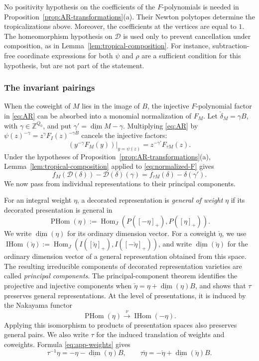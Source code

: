 \documentclass[11pt]{amsart}
\numberwithin{equation}{section}
\theoremstyle{definition}
\theoremstyle{remark}
\newcommand{\op}[1]{\operatorname{#1}}
\newcommand{\ZZ}{\mathbb Z}
\newcommand{\Hom}{\op{Hom}}
\newcommand{\dv}{\underline{\dim}}
\begin{document}
No positivity hypothesis on the coefficients of the $F$-polynomials is
needed in Proposition~\ref{prop:AR-transformations}(a). Their Newton
polytopes determine the tropicalizations above. Moreover, the
coefficients at the vertices are equal to $1$. The homeomorphism
hypothesis on $\mathcal D$ is used only to prevent cancellation under
composition, as in Lemma~\ref{lem:tropical-composition}. For instance,
subtraction-free coordinate expressions for both $\psi$ and $\rho$ are
a sufficient condition for this hypothesis, but are not part of the
statement.

\subsubsection*{The invariant pairings}

When the coweight of $M$ lies in the image of $B$, the injective
$F$-polynomial factor in \eqref{eq:AR} can be absorbed into a monomial
normalization of $F_M$. Let $\check\delta_M=\gamma B$, with $\gamma\in\ZZ^{Q_0}$, and put
$\gamma'=\dv M-\gamma$.
Multiplying \eqref{eq:AR} by
$\psi(z)^{-\gamma}=z^\gamma F_I(z)^{-\gamma B}$ cancels the
injective factors:
\begin{equation}\label{eq:normalized-F} \left(y^{-\gamma}F_M(y)\right)\big|_{y=\psi(z)}=z^{-\gamma'}F_{\tau M}(z).\end{equation}
Under the hypotheses of Proposition~\ref{prop:AR-transformations}(a),
Lemma~\ref{lem:tropical-composition} applied to \eqref{eq:normalized-F}
gives
\begin{equation}\label{eq:invariant-pairing} f_M(\mathcal D(\delta))-\mathcal D(\delta)(\gamma)=f_{\tau M}(\delta)-\delta(\gamma').\end{equation}
We now pass from individual representations to their principal
components.


For an integral weight $\eta$, a decorated representation is \emph{general of
weight} $\eta$ if its decorated presentation is general in
\[ \op{PHom}(\eta):=\Hom_J(P([-\eta]_+),P([\eta]_+)). \]
We write $\dv(\eta)$ for its ordinary dimension vector. For a
coweight $\check\eta$, we use
$\op{IHom}(\check\eta):=\Hom_J(I([\check\eta]_+),I([-\check\eta]_+))$,
and write $\dv(\check\eta)$ for the ordinary dimension vector of a
general representation obtained from this space.
The resulting irreducible components of decorated representation varieties
are called \emph{principal components}.
The principal-component theorem \cite[Theorem~3.11]{FeiR25} identifies the
projective and injective components when
$\check\eta=\eta+\dv(\eta)B$, and shows that $\tau$ preserves
general representations. At the level of presentations, it is induced by
the Nakayama functor
\[ \op{PHom}(\eta)\xrightarrow{\ \nu\ }\op{IHom}(-\eta). \]
Applying this isomorphism to products of presentation spaces also
preserves general pairs. We also write $\tau$ for the induced
translation of weights and coweights. Formula \eqref{eq:app-weights} gives
\begin{equation}\label{eq:generic-weight-AR} \tau^{-1}\eta=-\eta-\dv(\eta)B,\qquad \tau\check\eta=-\check\eta+\dv(\check\eta)B.\end{equation}
\end{document}
